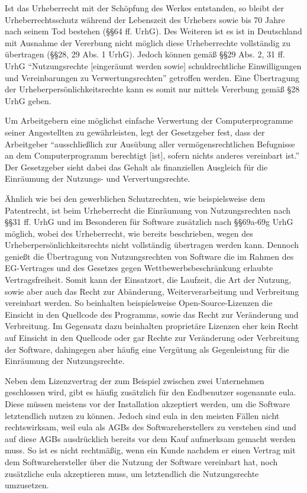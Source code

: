 Ist das Urheberrecht mit der Schöpfung des Werkes entstanden, so bleibt der Urheberrechtsschutz während der Lebenszeit des Urhebers sowie bis 70 Jahre nach seinem Tod bestehen (§§64 ff. UrhG).
Des Weiteren ist es ist in Deutschland mit Ausnahme der Vererbung nicht möglich diese Urheberrechte vollständig zu übertragen (§§28, 29 Abs. 1 UrhG). Jedoch können gemäß §§29 Abs. 2, 31 ff. UrhG
“Nutzungsrechte [eingeräumt werden sowie] schuldrechtliche Einwilligungen und Vereinbarungen zu Verwertungsrechten” getroffen werden. Eine Übertragung der Urheberpersönlichkeitsrechte
kann es somit nur mittels Vererbung gemäß §28 UrhG geben.

Um Arbeitgebern eine möglichst einfache Verwertung der Computerprogramme seiner Angestellten zu gewährleisten, legt der Gesetzgeber fest, dass der Arbeitgeber
“ausschließlich zur Ausübung aller vermögensrechtlichen Befugnisse an dem Computerprogramm berechtigt [ist], sofern nichts anderes vereinbart ist.” Der Gesetzgeber
sieht dabei das Gehalt als finanziellen Ausgleich für die Einräumung der Nutzungs- und Ververtungsrechte. 

Ähnlich wie bei den gewerblichen Schutzrechten, wie beispielsweise dem Patentrecht, ist beim Urheberrecht die Einräumung von Nutzungsrechten nach §§31 ff. UrhG und im Besonderen
für Software zusätzlich nach §§69a-69g UrhG möglich, wobei des Urheberrecht, wie bereits beschrieben, wegen des Urheberpersönlichkeitsrechts nicht vollständig übertragen werden kann.
Dennoch genießt die Übertragung von Nutzungsrechten von Software die im Rahmen des EG-Vertrages und des Gesetzes gegen Wettbewerbsbeschränkung erlaubte Vertragsfreiheit. Somit kann der Einsatzort, die Laufzeit,
die Art der Nutzung, sowie aber auch das Recht zur Abänderung, Weiterverarbeitung und Verbreitung vereinbart werden. So beinhalten beispielsweise Open-Source-Lizenzen die
Einsicht in den Quellcode des Programms, sowie das Recht zur Veränderung und Verbreitung. Im Gegensatz dazu beinhalten proprietäre Lizenzen eher kein Recht auf Einsicht in den
Quellcode oder gar Rechte zur Veränderung oder Verbreitung der Software, dahingegen aber häufig eine Vergütung als Gegenleistung für die Einräumung der Nutzungsrechte.

Neben dem Lizenzvertrag der zum Beispiel zwischen zwei Unternehmen geschlossen wird, gibt es häufig zusätzlich für den Endbenutzer sogenannte \gls{eula}.
Diese müssen meistens vor der Installation akzeptiert werden, um die Software letztendlich nutzen zu können.
Jedoch sind \gls{eula} in den meisten Fällen nicht rechtswirksam, weil \gls{eula} als AGBs des Softwareherstellers zu verstehen sind und auf diese AGBs ausdrücklich bereits vor dem
Kauf aufmerksam gemacht werden muss. So ist es nicht rechtmäßig, wenn ein Kunde nachdem er einen Vertrag mit dem Softwarehersteller über die Nutzung der Software vereinbart hat,
noch zusätzliche \gls{eula} akzeptieren muss, um letztendlich die Nutzungsrechte umzusetzen. 

